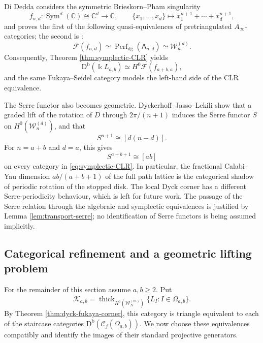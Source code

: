 \documentclass[12pt,a4paper,english,reqno]{amsart}
\theoremstyle{plain}
\theoremstyle{definition}
\newcommand{\kk}{\Bbbk}
\newcommand{\Db}{\mathrm D^{\mathrm b}}
\newcommand{\thick}{\operatorname{thick}}
\newcommand{\C}{\mathcal C}
\newcommand{\Wcat}{\mathcal W}
\newcommand{\Fcat}{\mathcal F}
\begin{document}
Di Dedda \cite[Corollary~1.4]{DiDedda} considers the symmetric Brieskorn--Pham
singularity
\begin{equation}
 f_{n,d}:\operatorname{Sym}^{d}(\mathbb C)\cong\mathbb C^d
 \longrightarrow\mathbb C,\qquad
 \{x_1,\ldots,x_d\}\longmapsto
 x_1^{n+1}+\cdots+x_d^{n+1},
\label{eq:symmetric-BP}
\end{equation}
and proves the first of the following quasi-equivalences of pretriangulated
$A_\infty$-categories; the second is \cite[Theorem~1]{DJL}:
\begin{equation}
 \Fcat(f_{n,d})
 \simeq\operatorname{Perf}_{\mathrm{dg}}(\mathsf A_{n,d})
 \simeq\Wcat_n^{(d)}.
\label{eq:DiDedda}
\end{equation}
Consequently, Theorem \ref{thm:symplectic-CLR} yields
\begin{equation}
 \Db(\kk L_{a,b})
 \simeq H^0\Fcat(f_{a+b,a}),
\label{eq:FS-lattice}
\end{equation}
and the same Fukaya--Seidel category models the left-hand side of the CLR
equivalence.

The Serre functor also becomes geometric.  Dyckerhoff--Jasso--Lekili
\cite[Proposition~2.5.1 and the following remark]{DJL} show
that a graded lift of the rotation of $D$ through
$2\pi/(n+1)$ induces the Serre functor $S$ on
$H^0(\Wcat_n^{(d)})$, and that
\begin{equation}
 S^{n+1}\cong[d(n-d)].
\label{eq:DJL-Serre}
\end{equation}
For $n=a+b$ and $d=a$, this gives
\begin{equation}
 S^{a+b+1}\cong[ab]
\label{eq:lattice-Serre}
\end{equation}
on every category in \eqref{eq:symplectic-CLR}.  In particular, the
fractional Calabi--Yau dimension $ab/(a+b+1)$ of the full path lattice is
the categorical shadow of periodic rotation of the stopped disk.  The
local Dyck corner has a different Serre-periodicity behaviour, which is
left for future work.  The passage of the Serre relation
through the algebraic and symplectic equivalences is justified by
Lemma \ref{lem:transport-serre}; no identification of Serre functors is being
assumed implicitly.

\subsection{Categorical refinement and a geometric lifting problem}

For the remainder of this section assume $a,b\geq2$.  Put
\begin{equation}
 \mathcal K_{a,b}
 =
 \thick_{H^0(\Wcat_N^{(m)})}
 \{L_I:I\in\overline\Omega_{a,b}\}.
\label{eq:dyck-fukaya-subcategory}
\end{equation}
By Theorem \ref{thm:dyck-fukaya-corner}, this category is triangle equivalent to
each of the staircase categories
$\Db(\C_j(\Omega_{a,b}))$.  We now choose these equivalences compatibly
and identify the images of their standard projective generators.
\end{document}
